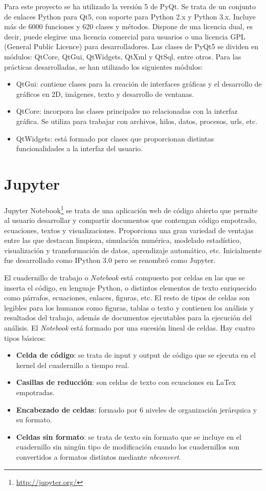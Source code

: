 Para este proyecto se ha utilizado la versión 5 de PyQt. Se trata de un conjunto de enlaces Python para Qt5, con soporte para Python 2.x y Python 3.x. Incluye más de 6000 funciones y 620 clases y métodos. Dispone de una licencia dual, es decir, puede elegirse una licencia comercial para usuarios o una licencia GPL (General Public Licence) para desarrolladores.
Las clases de PyQt5 se dividen en módulos: QtCore, QtGui, QtWidgets, QtXml y QtSql, entre otros. Para las prácticas desarrolladas, se han utilizado los siguientes módulos:
\begin{itemize}
	\item QtGui: contiene clases para la creación de interfaces gráficas y el desarrollo de gráficos en 2D, imágenes, texto y desarrollo de ventanas.
	\item QtCore: incorpora las clases principales no relacionadas con la interfaz gráfica. Se utiliza para trabajar con archivos, hilos, datos, procesos, urls, etc.
	\item QtWidgets: está formado por clases que proporcionan distintas funcionalidades a la interfaz del usuario.
\end{itemize}

\section{Jupyter}
Jupyter Notebook\footnote{\url{http://jupyter.org/}} se trata de una aplicación web de código abierto que permite al usuario desarrollar y compartir documentos que contengan código empotrado, ecuaciones, textos y visualizaciones. Proporciona una gran variedad de ventajas entre las que destacan limpieza, simulación numérica, modelado estadístico, visualización y transformación de datos, aprendizaje automático, etc. Inicialmente fue desarrollado como IPython 3.0 pero se renombró como Jupyter.

El cuadernillo de trabajo o \textit{Notebook} está compuesto por celdas en las que se inserta el código, en lenguaje Python, o distintos elementos de texto enriquecido como párrafos, ecuaciones, enlaces, figuras, etc. El resto de tipos de celdas son legibles para los humanos como figuras, tablas o texto y contienen los análisis y resultados del trabajo, además de documentos ejecutables para la ejecución del análisis.
El \textit{Notebook} está formado por una sucesión lineal de celdas. Hay cuatro tipos básicos:

\begin{itemize}
	\item \textbf{Celda de código}: se trata de input y output de código que se ejecuta en el kernel del cuadernillo a tiempo real.
	\item \textbf{Casillas de reducción}: son celdas de texto con ecuaciones en LaTex empotradas.
	\item \textbf{Encabezado de celdas}: formado por 6 niveles de organización jerárquica y su formato.
	\item \textbf{Celdas sin formato}: se trata de texto sin formato que se incluye en el cuadernillo sin ningún tipo de modificación cuando los cuadernillos son convertidos a formatos distintos mediante \textit{nbconvert}.
\end{itemize}

